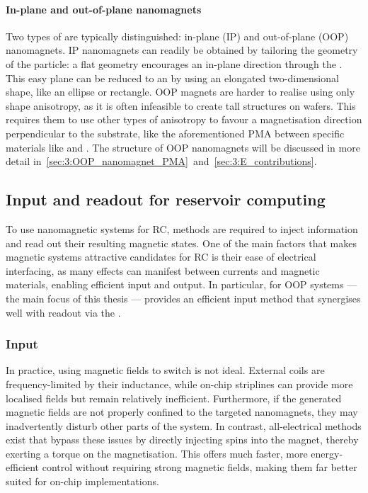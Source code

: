 \paragraph{In-plane and out-of-plane nanomagnets}\label{sec:1:IP_OOP} %
Two types of  are typically distinguished: in-plane (IP) and out-of-plane (OOP) nanomagnets.
IP nanomagnets can readily be obtained by tailoring the geometry of the  particle: a flat geometry encourages an in-plane  direction through the .
This easy plane can be reduced to an  by using an elongated two-dimensional shape, like an ellipse or rectangle.
OOP magnets are harder to realise using only shape anisotropy, as it is often infeasible to create tall structures on wafers.
This requires them to use other types of anisotropy to favour a magnetisation direction perpendicular to the substrate, like the aforementioned PMA between specific materials like  and .
The structure of OOP nanomagnets will be discussed in more detail in~\cref{sec:3:OOP_nanomagnet_PMA}~and~\ref{sec:3:E_contributions}.

\subsection{Input and readout for reservoir computing}\label{sec:1:ASI_IO}
To use nanomagnetic systems for RC, methods are required to inject information and read out their resulting magnetic states.
One of the main factors that makes magnetic systems attractive candidates for RC is their ease of electrical interfacing, as many effects can manifest between currents and magnetic materials, enabling efficient input and output.
In particular, for OOP systems --- the main focus of this thesis ---  provides an efficient input method that synergises well with readout via the .

\subsubsection{Input}
In practice, using magnetic fields to switch  is not ideal.
External coils are frequency-limited by their inductance, while on-chip striplines can provide more localised fields but remain relatively inefficient.
Furthermore, if the generated magnetic fields are not properly confined to the targeted nanomagnets, they may inadvertently disturb other parts of the system.
In contrast, all-electrical methods exist that bypass these issues by directly injecting spins into the magnet, thereby exerting a torque on the magnetisation.
This offers much faster, more energy-efficient control without requiring strong magnetic fields, making them far better suited for on-chip implementations.

